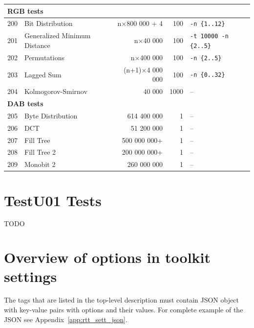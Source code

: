 \documentclass[
  digital,  	%
  color,		%
  oneside,   	%
  12pt,
  nocover,
  notable,
  nolof,
  nolot,
]{fithesis3}
\begin{document}
\begin{nomar}
\begin{tabular}{r | l | r | r | l}
\multicolumn{5}{l}{\textbf{RGB tests}} \\ \hline
200 & Bit Distribution             & n$\times$800 000 + 4 & 100 & \texttt{-n \{1..12\}} \\
201 & Generalized Minimum Distance & n$\times$40 000 & 100 & \texttt{-t 10000 -n \{2..5\}} \\
202 & Permutations                 & n$\times$400 000 & 100 & \texttt{-n \{2..5\}} \\
203 & Lagged Sum                   & (n+1)$\times$4 000 000 & 100 & \texttt{-n \{0..32\}} \\
204 & Kolmogorov-Smirnov           & 40 000 & 1000 & -- \\
\multicolumn{5}{l}{\textbf{DAB tests}} \\ \hline
205 & Byte Distribution & 614 400 000 & 1 & -- \\
206 & DCT               &  51 200 000 & 1 & -- \\
207 & Fill Tree         & 500 000 000+& 1 & -- \\
208 & Fill Tree 2       & 200 000 000+& 1 & -- \\
209 & Monobit 2         & 260 000 000 & 1 & -- \\
\end{tabular}
\end{nomar}

\chapter{TestU01 Tests}
\label{app:testu01_tests}
\begin{Huge}
TODO
\end{Huge}

\chapter{Overview of options in toolkit settings}
\label{app:toolkit_settings_detail}

The tags that are listed in the top-level description must contain JSON
object with key-value pairs with options and their values. For complete example of the JSON see Appendix~\ref{app:rtt_sett_json}.
\end{document}
